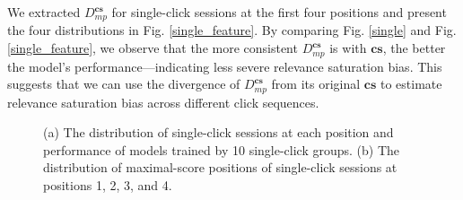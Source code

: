 We extracted \( D_{mp}^{\mathbf{cs}} \) for single-click sessions at the first four positions and present the four distributions in Fig. \ref{single_feature}. By comparing Fig. \ref{single} and Fig. \ref{single_feature}, we observe that the more consistent \( D_{mp}^{\mathbf{cs}} \) is with \( \mathbf{cs} \), the better the model's performance—indicating less severe relevance saturation bias. This suggests that we can use the divergence of \( D_{mp}^{\mathbf{cs}} \) from its original \( \mathbf{cs} \) to estimate relevance saturation bias across different click sequences.

\begin{figure}[!t]
\centering
\hspace{-1mm}
\caption{(a) The distribution of single-click sessions at each position and performance of models trained by 10 single-click groups. (b) The distribution of maximal-score positions of single-click sessions at positions 1, 2, 3, and 4.}
\end{figure}


